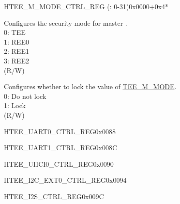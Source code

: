 \begin{register}{H}{TEE\_M\_MODE\_CTRL\_REG (: 0-31)}{0x0000+0x4*}\label{regdesc:TEEMNMODECTRLREG}
%
%
%
\regnewline%
\begin{regdesc}\begin{reglist}
\label{fielddesc:TEEMNMODE}\item [TEE\_M\regindex{n}\_MODE] Configures the security mode for master .\\
0: TEE \\
1: REE0 \\
2: REE1 \\
3: REE2  \\
(R/W)
\label{fielddesc:TEEMNLOCK}\item [TEE\_M\regindex{n}\_LOCK]Configures whether to lock the value of \hyperref[fielddesc:TEEMNMODE]{TEE\_M\_MODE}.\\
0: Do not lock \\
1: Lock  \\
(R/W)
\end{reglist}\end{regdesc}
\end{register}


\begin{register}{H}{TEE\_UART0\_CTRL\_REG}{0x0088}\label{regdesc:TEEUART0CTRLREG}
\end{register}\vspace{-3em}

\begin{register}{H}{TEE\_UART1\_CTRL\_REG}{0x008C}\label{regdesc:TEEUART1CTRLREG}
\end{register}\vspace{-3em}

\begin{register}{H}{TEE\_UHCI0\_CTRL\_REG}{0x0090}\label{regdesc:TEEUHCI0CTRLREG}
\end{register}\vspace{-3em}

\begin{register}{H}{TEE\_I2C\_EXT0\_CTRL\_REG}{0x0094}\label{regdesc:TEEI2CEXT0CTRLREG}
\end{register}\vspace{-3em}

\begin{register}{H}{TEE\_I2S\_CTRL\_REG}{0x009C}\label{regdesc:TEEI2SCTRLREG}
\end{register}\vspace{-3em}

